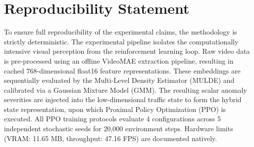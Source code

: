 \section*{Reproducibility Statement}
To ensure full reproducibility of the experimental claims, the methodology is strictly deterministic. The experimental pipeline isolates the computationally intensive visual perception from the reinforcement learning loop. Raw video data is pre-processed using an offline VideoMAE extraction pipeline, resulting in cached 768-dimensional float16 feature representations. These embeddings are sequentially evaluated by the Multi-Level Density Estimator (MULDE) and calibrated via a Gaussian Mixture Model (GMM). The resulting scalar anomaly severities are injected into the low-dimensional traffic state to form the hybrid state representation, upon which Proximal Policy Optimization (PPO) is executed. All PPO training protocols evaluate 4 configurations across 5 independent stochastic seeds for 20,000 environment steps. Hardware limits (VRAM: 11.65 MB, throughput: 47.16 FPS) are documented natively.
